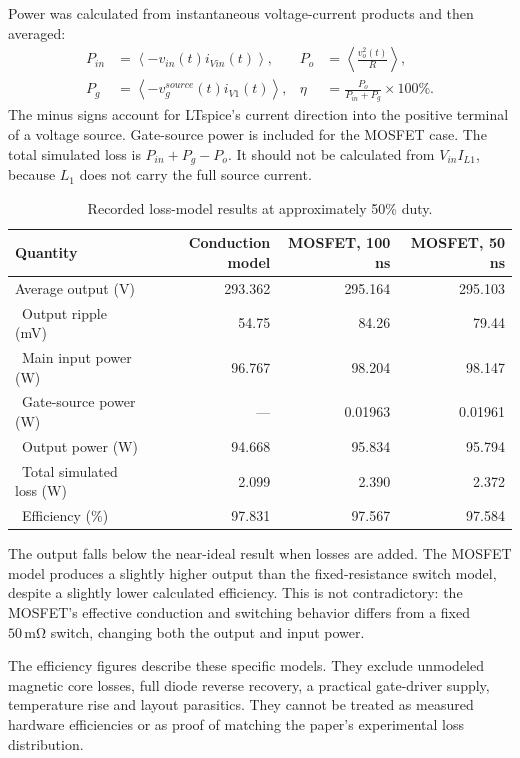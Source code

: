 \documentclass[11pt,a4paper]{article}
\newcommand{\unit}[1]{\,\mathrm{#1}}
\begin{document}
Power was calculated from instantaneous voltage-current products and then averaged:
\begin{align}
P_{in}&=\left\langle -v_{in}(t)i_{Vin}(t)\right\rangle,&
P_o&=\left\langle \frac{v_o^2(t)}{R}\right\rangle,\\
P_g&=\left\langle-v_g^{source}(t)i_{V1}(t)\right\rangle,&
\eta&=\frac{P_o}{P_{in}+P_g}\times100\%.
\end{align}
The minus signs account for LTspice's current direction into the positive terminal of a voltage source. Gate-source power is included for the MOSFET case. The total simulated loss is $P_{in}+P_g-P_o$. It should not be calculated from $V_{in}I_{L1}$, because $L_1$ does not carry the full source current.
\begin{table}[H]\centering\caption{Recorded loss-model results at approximately 50\% duty.}
\begin{tabular}{@{}lrrr@{}}\toprule
Quantity & Conduction model & MOSFET, 100 ns & MOSFET, 50 ns \\\midrule
Average output (V) & 293.362 & 295.164 & 295.103 \\\
Output ripple (mV) & 54.75 & 84.26 & 79.44 \\\
Main input power (W) & 96.767 & 98.204 & 98.147 \\\
Gate-source power (W) & --- & 0.01963 & 0.01961 \\\
Output power (W) & 94.668 & 95.834 & 95.794 \\\
Total simulated loss (W) & 2.099 & 2.390 & 2.372 \\\
Efficiency (\%) & 97.831 & 97.567 & 97.584 \\\bottomrule
\end{tabular}
\end{table}
The output falls below the near-ideal result when losses are added. The MOSFET model produces a slightly higher output than the fixed-resistance switch model, despite a slightly lower calculated efficiency. This is not contradictory: the MOSFET's effective conduction and switching behavior differs from a fixed $50\unit{m\Omega}$ switch, changing both the output and input power.

The efficiency figures describe these specific models. They exclude unmodeled magnetic core losses, full diode reverse recovery, a practical gate-driver supply, temperature rise and layout parasitics. They cannot be treated as measured hardware efficiencies or as proof of matching the paper's experimental loss distribution.
\clearpage
\end{document}
